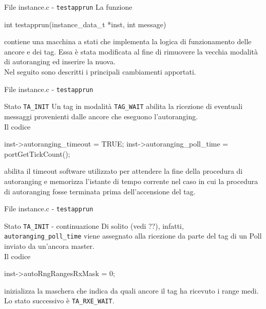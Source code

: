 \begin{frame}[fragile]{File instance.c - \lstinline[language=C]!testapprun!}
  La funzione
  \begin{C}
    int testapprun(instance_data_t *inst, int message)
  \end{C}
  contiene una macchina a stati che implementa la logica di funzionamento delle ancore e dei tag.
  Essa è stata modificata al fine di rimuovere la vecchia modalità di autoranging ed inserire la nuova.\\
  Nel seguito sono descritti i principali \alert{cambiamenti} apportati.
\end{frame}

\begin{frame}[fragile]{File instance.c - \lstinline[language=C]!testapprun!}
  \begin{block}{Stato \lstinline[language=C]!TA_INIT!}
    Un tag in modalità \lstinline[language=C]!TAG_WAIT! abilita la ricezione di eventuali messaggi
    provenienti dalle ancore che eseguono l'autoranging.\\
    Il codice
    \begin{C}
      inst->autoranging_timeout = TRUE;
      inst->autoranging_poll_time = portGetTickCount();
    \end{C}
    abilita il timeout software utilizzato per attendere la fine della procedura di autoranging e
    memorizza l'istante di tempo corrente nel caso in cui la procedura di autoranging fosse terminata
    prima dell'accensione del tag.
  \end{block}
\end{frame}

\begin{frame}[fragile]{File instance.c - \lstinline[language=C]!testapprun!}
  \begin{block}{Stato \lstinline[language=C]!TA_INIT! - continuazione}
    Di solito (vedi ??), infatti, \lstinline[language=C]!autoranging_poll_time! viene assegnato
    alla ricezione da parte del tag di un Poll inviato da un'ancora master.\\
    Il codice
    \begin{C}
      inst->autoRngRangesRxMask = 0;
    \end{C}
    inizializza la maschera che indica da quali ancore il tag ha ricevuto i range medi.\\
    \alert{Lo stato successivo} è \lstinline[language=C]!TA_RXE_WAIT!.
  \end{block}
\end{frame}

